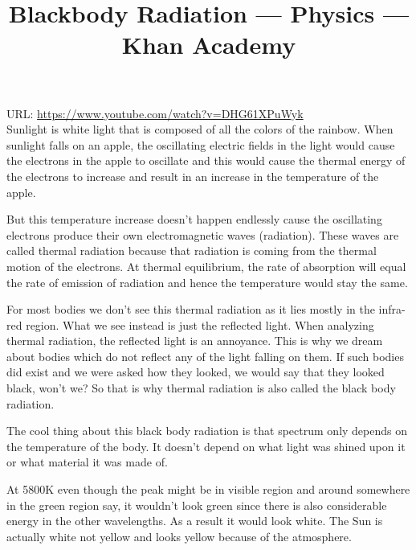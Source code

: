 \documentclass{../template/texnote}
\title{Blackbody Radiation --- Physics --- Khan Academy}
\begin{document}
    \maketitle {}

URL: \url{https://www.youtube.com/watch?v=DHG61XPuWyk}
\\

Sunlight is white light that is composed of all the colors of the rainbow.
When sunlight falls on an apple, the oscillating electric fields in the light would cause the electrons in the apple to oscillate and this would cause the thermal energy of the electrons to increase and result in an increase in the temperature of the apple.

But this temperature increase doesn't happen endlessly cause the oscillating electrons produce their own electromagnetic waves (radiation).
These waves are called thermal radiation because that radiation is coming from the thermal motion of the electrons.
At thermal equilibrium, the rate of absorption will equal the rate of emission of radiation and hence the temperature would stay the same.

For most bodies we don't see this thermal radiation as it lies mostly in the infra-red region. What we see instead is just the reflected light.
When analyzing thermal radiation, the reflected light is an annoyance.
This is why we dream about bodies which do not reflect any of the light falling on them.
If such bodies did exist and we were asked how they looked, we would say that they looked black, won't we?
So that is why thermal radiation is also called the black body radiation.

The cool thing about this black body radiation is that spectrum only depends on the temperature of the body.
It doesn't depend on what light was shined upon it or what material it was made of.

At 5800K even though the peak might be in visible region and around somewhere in the green region say, it wouldn't look green since there is also considerable energy in the other wavelengths. As a result it would look white.
The Sun is actually white not yellow and looks yellow because of the atmosphere.

    \printbibliography
\end{document}
